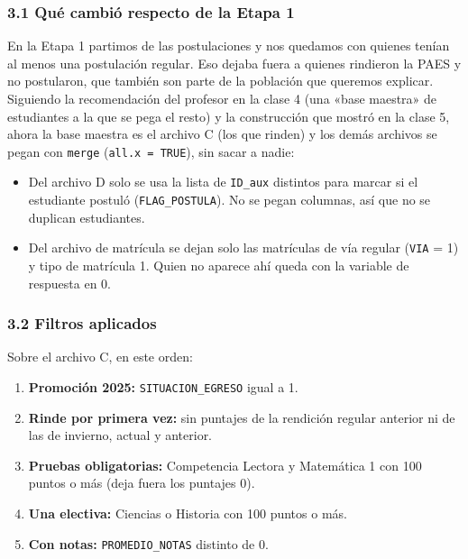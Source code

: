 \documentclass[11pt]{article}
\begin{document}
\subsubsection*{3.1 \; Qué cambió respecto de la Etapa 1}

En la Etapa 1 partimos de las postulaciones y nos quedamos con quienes
tenían al menos una postulación regular. Eso dejaba fuera a quienes
rindieron la PAES y no postularon, que también son parte de la población
que queremos explicar. Siguiendo la recomendación del profesor en la
clase 4 (una «base maestra» de estudiantes a la que se pega el resto) y
la construcción que mostró en la clase 5, ahora la base maestra es el
archivo C (los que rinden) y los demás archivos se pegan con \texttt{merge} (\texttt{all.x = TRUE}), sin sacar
a nadie:

\begin{itemize}[leftmargin=1.5em, itemsep=0.3em]
  \item Del archivo D solo se usa la lista de \texttt{ID\_aux} distintos
        para marcar si el estudiante postuló (\texttt{FLAG\_POSTULA}). No
        se pegan columnas, así que no se duplican estudiantes.
  \item Del archivo de matrícula se dejan solo las matrículas de vía
        regular (\texttt{VIA} = 1) y tipo de matrícula 1. Quien no
        aparece ahí queda con la variable de respuesta en 0.
\end{itemize}

\subsubsection*{3.2 \; Filtros aplicados}

Sobre el archivo C, en este orden:

\begin{enumerate}[leftmargin=1.5em, itemsep=0.3em, label=\textbf{\alph*)}]
  \item \textbf{Promoción 2025:} \texttt{SITUACION\_EGRESO} igual a 1.
  \item \textbf{Rinde por primera vez:} sin puntajes de la rendición
        regular anterior ni de las de invierno, actual y anterior.
  \item \textbf{Pruebas obligatorias:} Competencia Lectora y Matemática 1
        con 100 puntos o más (deja fuera los puntajes 0).
  \item \textbf{Una electiva:} Ciencias o Historia con 100 puntos o más.
  \item \textbf{Con notas:} \texttt{PROMEDIO\_NOTAS} distinto de 0.
\end{enumerate}
\end{document}
